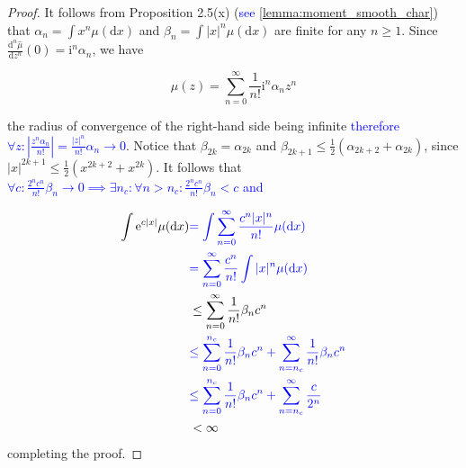 \documentclass[a4paper,11pt]{article}
\begin{document}
\begin{proof}
    It follows from Proposition 2.5(x) (\textcolor{blue}{see} \ref{lemma:moment_smooth_char}) that $\alpha_{n}=\int x^{n} \mu(\mathrm{d} x)$ and
    $\beta_{n}=\int|x|^{n} \mu(\mathrm{d} x)$ are finite for any $n \geq 1$. Since
    $\frac{\mathrm{d}^{n} \widehat{\mu}}{\mathrm{d} z^{n}}(0)=\mathrm{i}^{n} \alpha_{n}$, we have

    $$
        \widehat{\mu}(z)=\sum_{n=0}^{\infty} \frac{1}{n !} \mathrm{i}^{n} \alpha_{n} z^{n}
    $$

    the radius of convergence of the right-hand side being infinite \textcolor{blue}{ therefore $ \forall z: \left| \frac{z^{n} \alpha_{n}}{n!} \right| = \frac{|z|^{n} }{n!} \alpha_{n} \rightarrow 0$}. Notice that $\beta_{2 k}=\alpha_{2 k}$ and
    $\beta_{2 k+1} \leq \frac{1}{2}\left(\alpha_{2 k+2}+\alpha_{2 k}\right)$, since
    $|x|^{2 k+1} \leq \frac{1}{2}\left(x^{2 k+2}+x^{2 k}\right)$. It follows that
    \textcolor{blue}{
    $\forall c:\frac{2^{n}c^{n}}{n!} \beta_{n}\rightarrow 0 \implies \exists n _{c}: \forall n>n _{c}:\frac{2^{n}c^{n}}{n!} \beta_{n} <c$ and
    }

    \begin{align*}
        \int \mathrm{e}^{c|x|} \mu(\mathrm{d} x) & \textcolor{blue}{=  \int \sum_{n=0}^{\infty} \frac{c^{n} |x|^{n} }{n!} \mu(\mathrm{d} x)}   \\
                                                 & \textcolor{blue}{=  \sum_{n=0}^{\infty}\frac{c^{n} }{n!} \int |x|^{n} \mu(\mathrm{d} x)}    \\
                                                 & \le \sum_{n=0}^{\infty} \frac{1}{n !} \beta_{n} c^{n}                                       \\
                                                 & \textcolor{blue}{
        \le\sum_{n=0}^{n _{c}} \frac{1}{n !} \beta_{n} c^{n} + \sum_{n=n _{c}}^{\infty} \frac{1}{n !} \beta_{n} c^{n}                        } \\
                                                 & \textcolor{blue}{
        \le\sum_{n=0}^{n _{c}} \frac{1}{n !} \beta_{n} c^{n} + \sum_{n=n _{c}}^{\infty} \frac{c}{2^{n}}                                 }      \\
                                                 & < \infty
    \end{align*}
    completing the proof.

\end{proof}
\end{document}
